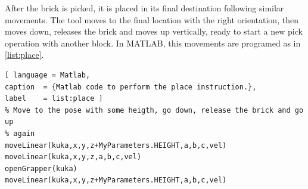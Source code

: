 After the brick is picked, it is placed in its final destination following similar movements. The tool moves to the final location with the right orientation, then moves down, releases the brick and moves up vertically, ready to start a new pick operation with another block. In MATLAB, this movements are programed as in \autoref{list:place}.
%
\begin{lstlisting}[ language = Matlab,
caption  = {Matlab code to perform the place instruction.},
label    = list:place ]
% Move to the pose with some heigth, go down, release the brick and go up
% again
moveLinear(kuka,x,y,z+MyParameters.HEIGHT,a,b,c,vel)
moveLinear(kuka,x,y,z,a,b,c,vel)
openGrapper(kuka)
moveLinear(kuka,x,y,z+MyParameters.HEIGHT,a,b,c,vel)
\end{lstlisting}